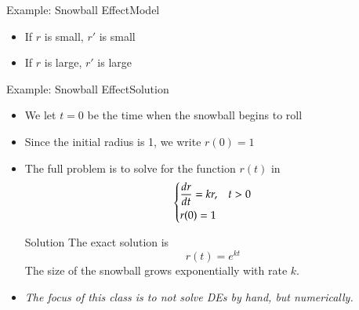 \documentclass[10pt]{beamer}
\begin{document}
\begin{frame}{Example: Snowball Effect}{Model}

\begin{itemize}
    \begin{block}{Model for the Snowball}       
    Let $r(t)$ be the radius at time $t$  
        \begin{equation*}
            \underbrace{\frac{dr}{dt}}_{\textrm{growth speed}} = k\underbrace{r}_{\textrm{current size}} 
        \end{equation*}
    Constant $k>0$ is a proportionality constant.
    \end{block}
    \item If $r$ is small, $r'$ is small
    \item If $r$ is large, $r'$ is large
\end{itemize}

{
}
\end{frame}
\begin{frame}{Example: Snowball Effect}{Solution}

\begin{itemize}
    \item We let $t=0$ be the time when the snowball begins to roll 
    \item Since the initial radius is 1, we write $r(0) = 1$ 

    \item The full problem is to solve for the function $r(t)$ in
        $$\begin{dcases}
        \frac{dr}{dt} = kr,  & t>0\\
           r(0) = 1 &
        \end{dcases}$$
    
    \begin{block}{Solution}
    The exact solution is 
        $$r(t) = e^{kt} $$
    The size of the snowball grows exponentially with rate $k$.
    \end{block}
        \vspace{3mm}
    \item \textit{The focus of this class is to not solve DEs by hand, but numerically.}
\end{itemize}
\end{frame}
\end{document}
